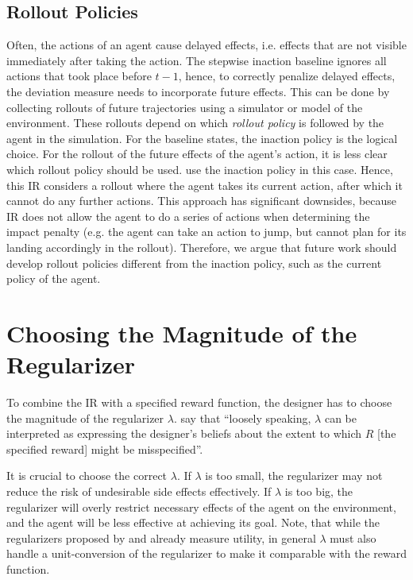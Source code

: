 \documentclass[letterpaper]{article} %
\begin{document}
\subsection{Rollout Policies}\label{sec:rollout_policies}
Often, the actions of an agent cause delayed effects, i.e. effects that are not visible immediately after taking the action. The stepwise inaction baseline \citep{turner2020conservative} ignores all actions that took place before $t-1$, hence, to correctly penalize delayed effects, the deviation measure needs to incorporate future effects. This can be done by collecting rollouts of future trajectories using a simulator or model of the environment. These rollouts depend on which \emph{rollout policy} is followed by the agent in the simulation. For the baseline states, the inaction policy is the logical choice. For the rollout of the future effects of the agent's action, it is less clear which rollout policy should be used. \citet{turner2020conservative} use the inaction policy in this case. Hence, this IR considers a rollout where the agent takes its current action, after which it cannot do any further actions. This approach has significant downsides, because IR does not allow the agent to do a series of actions when determining the impact penalty (e.g. the agent can take an action to jump, but cannot plan for its landing accordingly in the rollout). Therefore, we argue that future work should develop rollout policies different from the inaction policy, such as the current policy of the agent.

\section{Choosing the Magnitude of the Regularizer}
\label{sec:magnitude}

To combine the IR with a specified reward function, the designer has to choose the magnitude of the regularizer $\lambda$. \citet{turner2020conservative} say that ``loosely speaking, $\lambda$ can be interpreted as expressing the designer's beliefs about the extent to which $R$ [the specified reward] might be misspecified''.

It is crucial to choose the correct $\lambda$. If $\lambda$ is too small, the regularizer may not reduce the risk of undesirable side effects effectively. If $\lambda$ is too big, the regularizer will overly restrict necessary effects of the agent on the environment, and the agent will be less effective at achieving its goal. Note, that while the regularizers proposed by \citet{krakovna2018penalizing} and \citet{turner2020conservative} already measure utility, in general $\lambda$ must also handle a unit-conversion of the regularizer to make it comparable with the reward function.
\end{document}
